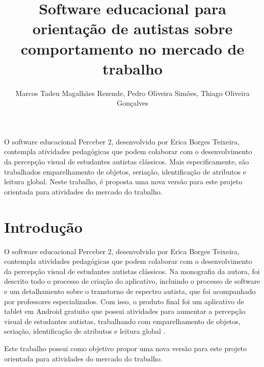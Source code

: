 \documentclass[12pt]{article}
\title{Software educacional para orientação de autistas sobre comportamento no mercado de trabalho}
\author{Marcos Tadeu Magalhães Rezende\inst{1}, Pedro Oliveira Simões\inst{1}, Thiago Oliveira Gonçalves\inst{1} }
\begin{document}
 

\maketitle


     
\begin{resumo}
  O software educacional Perceber 2, desenvolvido por Erica Borges Teixeira, contempla atividades pedagógicas que podem colaborar com o desenvolvimento da percepção visual de estudantes autistas clássicos. Mais especificamente, são trabalhados emparelhamento de objetos, seriação, identificação de atributos e leitura global. Neste trabalho, é proposta uma nova versão para este projeto orientada para atividades do mercado do trabalho.
\end{resumo}

\section{Introdução}

O software educacional Perceber 2, desenvolvido por Erica Borges Teixeira, contempla atividades pedagógicas que podem colaborar com o desenvolvimento da percepção visual de estudantes autistas clássicos. Na monografia da autora, foi descrito todo o processo de criação do aplicativo, incluindo o processo de software e um detalhamento sobre o transtorno de espectro autista, que foi acompanhado por professores especializados. Com isso, o produto final foi um aplicativo de tablet em Android gratuito que possui atividades para aumentar a percepção visual de estudantes autistas, trabalhando com emparelhamento de objetos, seriação, identificação de atributos e leitura global \cite{Perceber2}.

Este trabalho possui como objetivo propor uma nova versão para este projeto orientada para atividades do mercado do trabalho.
\end{document}
